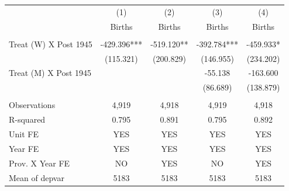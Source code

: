 \begin{tabular}{lcccc} \hline
 & (1) & (2) & (3) & (4) \\
 & Births & Births & Births & Births \\ \hline
 &  &  &  &  \\
Treat (W) X Post 1945 & -429.396*** & -519.120** & -392.784*** & -459.933* \\
 & (115.321) & (200.829) & (146.955) & (234.202) \\
Treat (M) X Post 1945 &  &  & -55.138 & -163.600 \\
 &  &  & (86.689) & (138.879) \\
 &  &  &  &  \\
Observations & 4,919 & 4,918 & 4,919 & 4,918 \\
R-squared & 0.795 & 0.891 & 0.795 & 0.892 \\
Unit FE & YES & YES & YES & YES \\
Year FE & YES & YES & YES & YES \\
Prov. X Year FE & NO & YES & NO & YES \\
 Mean of depvar & 5183 & 5183 & 5183 & 5183 \\ \hline
\end{tabular}
